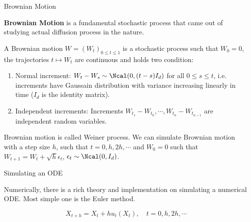 \documentclass[aspectratio=169,xcolor=dvipsnames,svgnames,x11names,fleqn]{beamer}
\begin{document}
\begin{frame}{Brownian Motion}

    \textbf{Brownian Motion} is a fundamental stochastic process that came out of studying actual diffusion process in the nature.

    \vspace{10pt}

        \begin{tcolorbox}[enhanced, colback=red!5, colframe=red!60!black, boxrule=0.5pt, rightrule = 2mm, leftrule = 0mm, toprule=0mm, bottomrule=0mm,  fonttitle=\bfseries]
            A Brownian motion $W = (W_t)_{0 \leq t \leq 1}$ is a stochastic process such that $W_0 = 0$, the trajectories $ t \mapsto W_t$ are continuous and holds two condition:
            \begin{enumerate}
                \item Normal increment: $W_t - W_s \sim \Ncal(0, (t-s)I_d)$ for all $ 0 \leq s \leq t $, i.e. increments have Gaussain distribution with variance increasing linearly in time ($I_d$ is the identity matrix).
                \item Independent increments: Increments $W_{t_1} - W_{t_0}, \cdots , W_{t_n} - W_{t_{n-1}}$ are independent random variables.
            \end{enumerate}
        \end{tcolorbox}

        \scriptsize

        Brownian motion is called Weiner process. We can simulate Brownian motion with a step size $h$, such that $ t= 0, h, 2h, \cdots $ and $W_0 = 0$ such that $W_{t+1} = W_t + \sqrt{h}\epsilon_t$, $\epsilon_t \sim \Ncal(0, I_d)$.
    
\end{frame}

\begin{frame}{Simulating an ODE}

    Numerically, there is a rich theory and implementation on simulating a numerical ODE. Most simple one is the Euler method.

    $$
    X_{t+h} = X_t + h u_t(X_t), \quad t = 0, h, 2h, \cdots
    $$
    
\end{frame}
\end{document}
